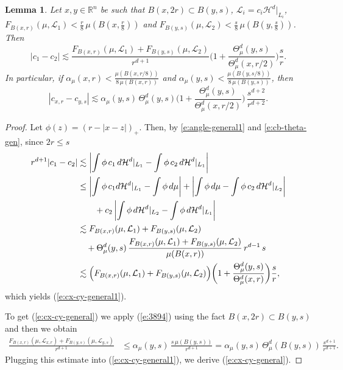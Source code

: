 \documentclass[11pt]{amsart}
\newcommand{\HH}{{\mathcal H}}
\newcommand{\LL}{{\mathcal L}}
\newcommand{\rf}[1]{{(\ref{#1})}}
\newtheorem{lemma}[theorem]{Lemma}
\theoremstyle{definition}
\theoremstyle{remark}
\numberwithin{equation}{section}
\def\cH{{\mathcal{H}}}
\newcommand{\av}[1]{\left| #1 \right|}
\def\lec{\lesssim}
\def\lec{\lesssim}
\begin{document}
\begin{lemma}\label{l:cx-cy-general}
	Let $x,y\in \mathbb{R}^{n}$ be such that $B(x,2r)\subset B(y,s)$, $\LL_{i}= c_{i}\HH^{d}|_{L_{i}}$,  { $F_{B(x,r)}(\mu,\LL_{1})< \frac r8\,\mu(B(x,\frac r8))$ and  { $F_{B(y,s)}(\mu,\LL_{2})< \frac s8\,\mu(B(y,\frac s8))$}}. Then
	\begin{equation}
	\label{e:cx-cy-general1}
	{ |c_{1}-c_{2}| \lec  \frac{ F_{B(x,r)}(\mu,\LL_{1}) + F_{B(y,s)}(\mu,\LL_{2})}{r^{d+1}} \biggl(1+ \frac{\Theta^d_{\mu}(y,s)}{\Theta^d_{\mu}(x,r/2)}\biggr)\frac sr.}
	\end{equation}
	In particular, if  $\alpha_{\mu}(x,r)<\frac{\mu(B(x,r/8))}{8\,\mu(B(x,r))}$
	and $\alpha_{\mu}(y,s)<\frac{\mu(B(y,s/8))}{8\,\mu(B(y,s))}$, then
	\begin{equation}
	\label{e:cx-cy-general}
	{ |c_{x,r}-c_{y,s}| \lec  \alpha_\mu(y,s)\,\Theta^d_\mu(y,s) \biggl(1+ \frac{\Theta^d_{\mu}(y,s)}{\Theta^d_{\mu}(x,r/2)}\biggr)\,\frac{ s^{d+2}}{r^{d+2}}.}
	\end{equation}
\end{lemma}

\begin{proof}
	Let $\phi(z) =(r-|x-z|)_{+}$. Then, by \eqref{e:angle-general1} and
	\eqref{e:cb-theta-gen}, since $2r\le s$
	\begin{align*}
	r^{d+1} |c_{1} -c_{2} |
	&  \lec \av{\int \phi \,c_{1}\, d\cH^{d}|_{L_{1}}  -\int \phi\, c_{2}\, d\cH^{d}|_{L_{1}} }\\
	& \leq \av{\int \phi \,c_{1} d\cH^{d}|_{L_{1}}  -\int \phi \,d\mu}
	+\av{\int \phi \,d\mu -  \int \phi \,c_{2}\, d\cH^{d}|_{L_{2}} }\\
	& \qquad		+c_{2} \av{\int \phi \, d\cH^{d}|_{L_{2}}  -\int \phi\, d\cH^{d}|_{L_{1}} }\\
	& \lec F_{B(x,r)}(\mu,\LL_{1}) + F_{B(y,s)}(\mu,\LL_{2}) \\
	&\quad + 
	\Theta^d_\mu(y,s)\, \frac{ F_{B(x,r)}(\mu,\LL_{1}) + F_{B(y,s)}(\mu,\LL_{2})}{\mu(B(x,r))} \,r^{d-1}\,s\\
	& \lesssim \Bigl( F_{B(x,r)}(\mu,\LL_{1}) + F_{B(y,s)}(\mu,\LL_{2})\Bigr) \biggl(1+ \frac{\Theta^d_{\mu}(y,s)}{\Theta^d_{\mu}(x,r)}\biggr)\frac sr,
	\end{align*}
	which yields \rf{e:cx-cy-general1}.
	
	To get \rf{e:cx-cy-general} we apply \rf{e:3894} using the fact $B(x,2r)\subset B(y,s)$and then we obtain
	\begin{align}
	\frac{ F_{B(x,r)}(\mu,\LL_{x,r}) + F_{B(y,s)}(\mu,\LL_{y,s})}{r^{d+1}} 
		& \leq %
	 \alpha_\mu(y,s) \,\frac{s\,\mu(B(y,s))}{r^{d+1}} = \alpha_\mu(y,s) \,\Theta^d_\mu(B(y,s))\,\frac{s^{d+1}}{r^{d+1}}
	 .\nonumber
	\end{align}
	Plugging this estimate into \rf{e:cx-cy-general1}, we derive \rf{e:cx-cy-general}.	
\end{proof}
\end{document}

